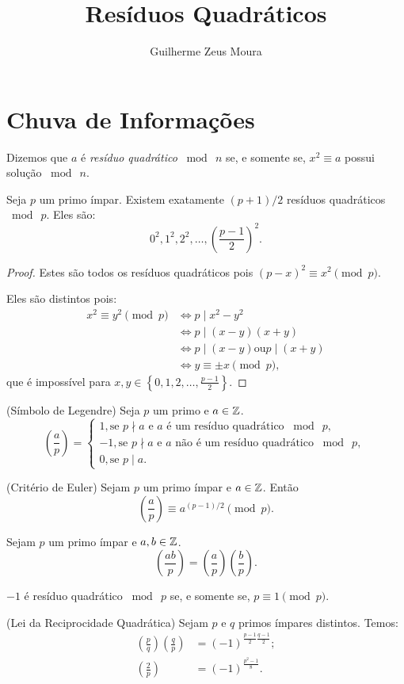 \documentclass[10pt,a4paper]{article}
\title{Resíduos Quadráticos}
\author{Guilherme Zeus Moura}
\newcommand{\leg}[2]{\left(\frac{#1}{#2}\right)}
\newcommand{\tmod}[1]{\bmod{\ #1}}
\begin{document}
	
	\zeustitle
	\section*{Chuva de Informações}
	\begin{defn}
		Dizemos que $a$ é \textit{resíduo quadrático} $\tmod{n}$ se, e somente se, $x^2 \equiv a$ possui solução $\tmod{n}$.
	\end{defn}
	\begin{prop}
		Seja $p$ um primo ímpar. Existem exatamente $(p+1)/2$ resíduos quadráticos $\tmod{p}$. Eles são:
		$$ 0^2,  1^2, 2^2, \dots, \left( \frac{p-1}{2} \right)^2.$$
	\end{prop}
	\begin{proof}
		Estes são todos os resíduos quadráticos pois $(p-x)^2 \equiv x^2 \pmod{p}$.
		
		Eles são distintos pois:
		\begin{align*}
			x^2 \equiv y^2 \pmod{p} & \iff p \mid x^2 - y^2\\
			                        & \iff p \mid (x - y)(x + y)\\
				           	 	    & \iff p \mid (x-y) \text{ou} p \mid (x+y)\\
						            & \iff y \equiv \pm x \pmod{p},
		\end{align*}
		que é impossível para $x, y \in \left\{ 0, 1, 2, \dots, \frac{p-1}{2} \right\}$.
	\end{proof}
	\begin{defn}(Símbolo de Legendre)
		Seja $p$ um primo e $a \in \mathbb{Z}$.
		$$\leg{a}{p} =
		\begin{cases}
			1,  \text{se $p \nmid a$ e $a$ é um resíduo quadrático $\tmod{p}$, }\\
			-1, \text{se $p \nmid a$  e $a$ não é um resíduo quadrático $\tmod{p}$, }\\
			0,  \text{se $p \mid a$.}
		\end{cases}$$
	\end{defn}
	\begin{thm}(Critério de Euler)
		Sejam $p$ um primo ímpar e $a \in \mathbb{Z}$. Então
		$$\leg{a}{p} \equiv a^{(p-1)/2}\pmod{p}.$$
	\end{thm}
	\begin{cor}
		Sejam $p$ um primo ímpar e $a, b \in \mathbb{Z}$.
		$$\leg{ab}{p} = \leg{a}{p}\leg{b}{p}.$$
	\end{cor}
	\begin{cor}
		$-1$ é resíduo quadrático $\tmod{p}$ se, e somente se, $p \equiv 1 \pmod{p}$.
	\end{cor}
	\begin{thm}(Lei da Reciprocidade Quadrática)
		Sejam $p$ e $q$ primos ímpares distintos. Temos:
		\begin{align*}
			\leg{p}{q} \leg{q}{p} & = (-1)^{\frac{p-1}{2}\frac{q-1}{2}};\\
			\leg{2}{p} & = (-1)^\frac{p^2 - 1}{8}.
		\end{align*}
	\end{thm}\
\end{document}
